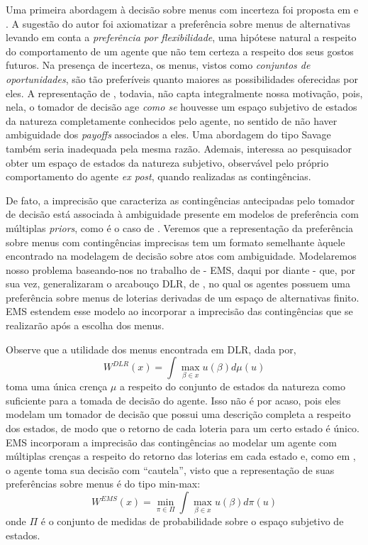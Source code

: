 \documentclass[12pt, a4paper]{article}
\theoremstyle{nonumberplain}
\theoremstyle{plain}
\theoremstyle{plain}
\theoremstyle{plain}
\theoremstyle{nonumberplain}
\begin{document}
Uma primeira abordagem à decisão sobre menus com incerteza foi proposta em \cite{Kreps1979} e \cite{Kreps1992}. A sugestão do autor foi axiomatizar a preferência sobre menus de alternativas levando em conta a \emph{preferência por flexibilidade}, uma hipótese natural a respeito do comportamento de um agente que não tem certeza a respeito dos seus gostos futuros. Na presença de incerteza, os menus, vistos como \emph{conjuntos de oportunidades}, são tão preferíveis quanto maiores as possibilidades oferecidas por eles. A representação de \cite{Kreps1979}, todavia, não capta integralmente nossa motivação, pois, nela, o tomador de decisão age \emph{como se} houvesse um espaço subjetivo de estados da natureza completamente conhecidos pelo agente, no sentido de não haver ambiguidade dos \emph{payoffs} associados a eles. Uma abordagem do tipo Savage também seria inadequada pela mesma razão. Ademais, interessa ao pesquisador obter um espaço de estados da natureza subjetivo, observável pelo próprio comportamento do agente \emph{ex post}, quando realizadas as contingências.

De fato, a imprecisão que caracteriza as contingências antecipadas pelo tomador de decisão está associada à ambiguidade presente em modelos de preferência com múltiplas \emph{priors}, como é o caso de \cite{Gilboa1989}. Veremos que a representação da preferência sobre menus com contingências imprecisas tem um formato semelhante àquele encontrado na modelagem de decisão sobre atos com ambiguidade.
Modelaremos nosso problema baseando-nos no trabalho de \cite{Epstein2007} - EMS, daqui por diante - que, por sua vez, generalizaram o arcabouço DLR, de \cite{Dekel2001}, no qual os agentes possuem uma preferência sobre menus de loterias derivadas de um espaço de alternativas finito. EMS estendem esse modelo ao incorporar a imprecisão das contingências que se realizarão após a escolha dos menus.

Observe que a utilidade dos menus encontrada em DLR, dada por,
$$ W^{DLR}(x)=\int \max_{\beta\in x}u(\beta)d\mu(u) $$
toma uma única crença $\mu$ a respeito do conjunto de estados da natureza como suficiente para a tomada de decisão do agente. Isso não é por acaso, pois eles modelam um tomador de decisão que possui uma descrição completa a respeito dos estados, de modo que o retorno de cada loteria para um certo estado é único. EMS incorporam a imprecisão das contingências ao modelar um agente com múltiplas crenças a respeito do retorno das loterias em cada estado e, como em \cite{Gilboa1989}, o agente toma sua decisão com ``cautela'', visto que a representação de suas preferências sobre menus é do tipo min-max: $$W^{EMS}(x)=\min_{\pi\in\Pi} \int \max_{\beta\in x}u(\beta)d\pi(u)$$ onde $\Pi$ é o conjunto de medidas de probabilidade sobre o espaço subjetivo de estados.
\end{document}
